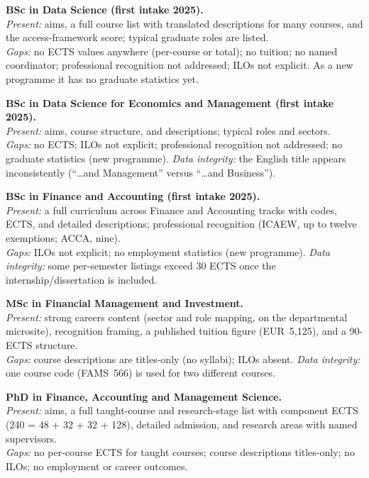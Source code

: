 \documentclass[11pt,a4paper]{article}
\begin{document}
\textbf{BSc in Data Science (first intake 2025).}\\
\emph{Present:} aims, a full course list with translated descriptions for many courses, and the access-framework score; typical graduate roles are listed.\\
\emph{Gaps:} no ECTS values anywhere (per-course or total); no tuition; no named coordinator; professional recognition not addressed; ILOs not explicit. As a new programme it has no graduate statistics yet.

\textbf{BSc in Data Science for Economics and Management (first intake 2025).}\\
\emph{Present:} aims, course structure, and descriptions; typical roles and sectors.\\
\emph{Gaps:} no ECTS; ILOs not explicit; professional recognition not addressed; no graduate statistics (new programme). \emph{Data integrity:} the English title appears inconsistently (``\ldots and Management'' versus ``\ldots and Business'').

\textbf{BSc in Finance and Accounting (first intake 2025).}\\
\emph{Present:} a full curriculum across Finance and Accounting tracks with codes, ECTS, and detailed descriptions; professional recognition (ICAEW, up to twelve exemptions; ACCA, nine).\\
\emph{Gaps:} ILOs not explicit; no employment statistics (new programme). \emph{Data integrity:} some per-semester listings exceed 30 ECTS once the internship/dissertation is included.

\textbf{MSc in Financial Management and Investment.}\\
\emph{Present:} strong careers content (sector and role mapping, on the departmental microsite), recognition framing, a published tuition figure (EUR~5{,}125), and a 90-ECTS structure.\\
\emph{Gaps:} course descriptions are titles-only (no syllabi); ILOs absent. \emph{Data integrity:} one course code (FAMS~566) is used for two different courses.

\textbf{PhD in Finance, Accounting and Management Science.}\\
\emph{Present:} aims, a full taught-course and research-stage list with component ECTS (240 = 48 + 32 + 32 + 128), detailed admission, and research areas with named supervisors.\\
\emph{Gaps:} no per-course ECTS for taught courses; course descriptions titles-only; no ILOs; no employment or career outcomes.
\end{document}
